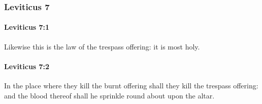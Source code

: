 	\subsubsection{Leviticus 7} %
		\label{LEVITICUS-7}

		\paragraph{Leviticus 7:1} %
			\label{LEVITICUS-7-1}

			Likewise this is the law of the trespass offering: it is most holy.


		\paragraph{Leviticus 7:2} %
			\label{LEVITICUS-7-2}

			In the place where they kill the burnt offering shall they kill the trespass offering: and the blood thereof shall he sprinkle round about upon the altar.

